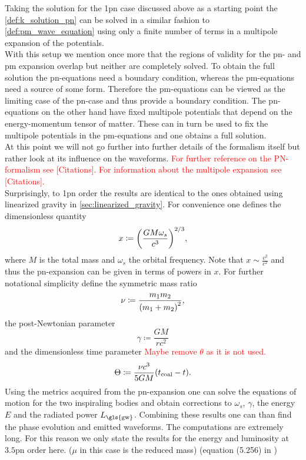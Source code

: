 Taking the solution for the 1\gls{pn} case discussed above as a starting point the \eqref{def:k_solution_pn} can be solved in a similar fashion to \eqref{def:pm_wave_equation} using only a finite number of terms in a multipole expansion of the potentials.\medskip\\
With this setup we mention once more that the regions of validity for the \gls{pn}- and \gls{pm} expansion overlap but neither are completely solved. To obtain the full solution the \gls{pn}-equations need a boundary condition, whereas the \gls{pm}-equations need a source of some form. Therefore the \gls{pm}-equations can be viewed as the limiting case of the \gls{pn}-case and thus provide a boundary condition. The \gls{pn}-equations on the other hand have fixed multipole potentials that depend on the energy-momentum tensor of matter. These can in turn be used to fix the multipole potentials in the \gls{pm}-equations and one obtains a full solution.\\
At this point we will not go further into further details of the formalism itself but rather look at its influence on the waveforms. \textcolor{red}{For further reference on the PN-formalism see [Citations]. For information about the multipole expansion see [Citations].}\medskip\\
Surprisingly, to 1\gls{pn} order the results are identical to the ones obtained using linearized gravity in \autoref{sec:linearized_gravity}. For convenience one defines the dimensionless quantity
\begin{equation}
x\coloneqq {\left( \frac{G M \omega_s}{c^3} \right)}^{2/3},
\end{equation}
where $M$ is the total mass and $\omega_s$ the orbital frequency. Note that $x\sim \frac{v^2}{c^2}$ and thus the \gls{pn}-expansion can be given in terms of powers in $x$. For further notational simplicity define the symmetric mass ratio
\begin{equation}
\nu\coloneqq \frac{m_1 m_2}{{\left( m_1 + m_2 \right)}^2},
\end{equation}
the post-Newtonian parameter
\begin{equation}
\gamma\coloneqq \frac{G M}{r c^2}
\end{equation}
and the dimensionless time parameter \textcolor{red}{Maybe remove $\theta$ as it is not used.}
\begin{equation}
\Theta\coloneqq \frac{\nu c^3}{5 G M}{\left( t_\text{coal}-t \right)}.
\end{equation}
Using the metrics acquired from the \gls{pn}-expansion one can solve the equations of motion for the two inspiraling bodies and obtain corrections to $\omega_s$, $\gamma$, the energy $E$ and the radiated power $L_\text{\gls{gw}}$. Combining these results one can than find the phase evolution and emitted waveforms. The computations are extremely long. For this reason we only state the results for the energy and luminosity at $3.5$\gls{pn} order here. ($\mu$ in this case is the reduced mass) (equation (5.256) in \cite{gwv1})
